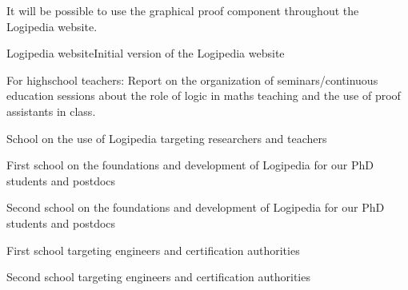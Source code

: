 \begin{workpackage}[id=dissemination,wphases=0-48,type=MGT,
  short=Dissemination,%
  title={Dissemination, communication and exploitation},
  lead=Inr]
\begin{tasklist}
\begin{task}[id=edukera,
      title=Web interface for doing proofs at school,
      lead=Edu,EduRM=12]
      It will be possible to use the graphical proof component throughout
      the Logipedia website.
  \end{task}

\end{tasklist}

\begin{wpdelivs}

  
  \begin{wpdeliv}[due=1,miles=startup,id=requirements,dissem=PU,nature=DEC,lead=Inr]{Logipedia website}Initial version of the Logipedia website
  \end{wpdeliv}

  
  \begin{wpdeliv}[due=18,miles=???,id=continuoused,dissem=PU,nature=R,lead=Str]{
 For highschool teachers: Report on the organization of seminars/continuous education sessions about the role of logic in maths teaching and the use of proof assistants in class.}
  \end{wpdeliv}

  \begin{wpdeliv}[due=36,miles=???,id=school-researchers,dissem=PU,nature=other,lead=Bir]{School on the use of Logipedia targeting researchers and teachers}
  \end{wpdeliv}

  \begin{wpdeliv}[due=12,miles=???,id=school-first-phd,dissem=PU,nature=other,lead=Bir]{First school on the foundations and development of Logipedia for our PhD students and postdocs}
  \end{wpdeliv}

  \begin{wpdeliv}[due=24,miles=???,id=school-second-phd,dissem=PU,nature=other,lead=Bir]{Second school on the foundations and development of Logipedia for our PhD students and postdocs}
  \end{wpdeliv}

  \begin{wpdeliv}[due=12,miles=???,id=school-first-certif,dissem=PU,nature=other,lead=Irt]{First school targeting engineers and certification authorities}
  \end{wpdeliv}
  
  \begin{wpdeliv}[due=24,miles=???,id=school-second-certif,dissem=PU,nature=other,lead=Irt]{Second school targeting engineers and certification authorities}
  \end{wpdeliv}

  
  
\end{wpdelivs}

\end{workpackage}


